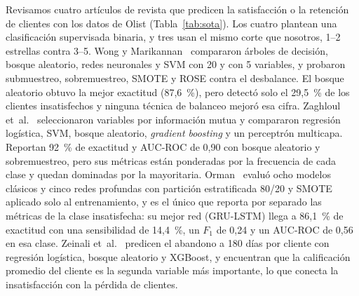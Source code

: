 \documentclass[journal]{IEEEtran}
\begin{document}
Revisamos cuatro artículos de revista que predicen la satisfacción o la retención de clientes con los datos de Olist (Tabla~\ref{tab:sota}). Los cuatro plantean una clasificación supervisada binaria, y tres usan el mismo corte que nosotros, 1--2 estrellas contra 3--5. Wong y Marikannan~\cite{wong2020} compararon árboles de decisión, bosque aleatorio, redes neuronales y SVM con 20 y con 5 variables, y probaron submuestreo, sobremuestreo, SMOTE y ROSE contra el desbalance. El bosque aleatorio obtuvo la mejor exactitud (87,6~\%), pero detectó solo el 29,5~\% de los clientes insatisfechos y ninguna técnica de balanceo mejoró esa cifra. Zaghloul et~al.~\cite{zaghloul2024} seleccionaron variables por información mutua y compararon regresión logística, SVM, bosque aleatorio, \emph{gradient boosting} y un perceptrón multicapa. Reportan 92~\% de exactitud y AUC-ROC de 0,90 con bosque aleatorio y sobremuestreo, pero sus métricas están ponderadas por la frecuencia de cada clase y quedan dominadas por la mayoritaria. Orman~\cite{orman2026} evaluó ocho modelos clásicos y cinco redes profundas con partición estratificada 80/20 y SMOTE aplicado solo al entrenamiento, y es el único que reporta por separado las métricas de la clase insatisfecha: su mejor red (GRU-LSTM) llega a 86,1~\% de exactitud con una sensibilidad de 14,4~\%, un $F_1$ de 0,24 y un AUC-ROC de 0,56 en esa clase. Zeinali et~al.~\cite{zeinali2026} predicen el abandono a 180 días por cliente con regresión logística, bosque aleatorio y XGBoost, y encuentran que la calificación promedio del cliente es la segunda variable más importante, lo que conecta la insatisfacción con la pérdida de clientes.
\end{document}
